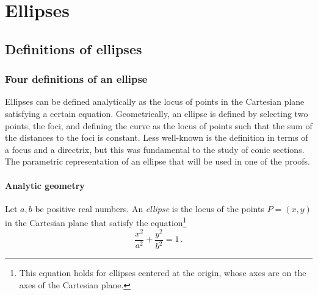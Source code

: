 
\part{Ellipses}



\chapter{Definitions of ellipses}\label{s.definitions}

\section{Four definitions of an ellipse}

Ellipses can be defined analytically as the locus of points in the Cartesian plane satisfying a certain equation. Geometrically, an ellipse is defined by selecting two points, the foci, and defining the curve as the locus of points such that the sum of the distances to the foci is constant. Less well-known is the definition in terms of a focus and a directrix, but this was fundamental to the study of conic sections. The parametric representation of an ellipse that will be used in one of the proofs.

\subsection*{Analytic geometry}

\begin{definition}\label{def.analytic}
Let $a,b$ be positive real numbers. An \emph{ellipse} is the locus of the points $P=(x,y)$ in the Cartesian plane that satisfy the equation\footnote{This equation holds for ellipses centered at the origin, whose axes are on the axes of the Cartesian plane.}
\begin{equation}
\frac{x^2}{a^2}+\frac{y^2}{b^2}=1\,.\label{eqn.ellipse-formula}
\end{equation}
\end{definition}



